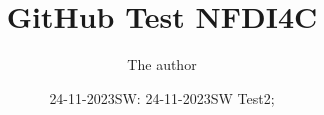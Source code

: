 \documentclass[11pt]{book}
\title{GitHub Test NFDI4C}
\author{The author}
\date{24-11-2023SW:  24-11-2023SW Test2;}
\begin{document}
\maketitle
\def\title#1{\chapter{#1}}
\tableofcontents

        
        
        
        
        
        
\end{document}
